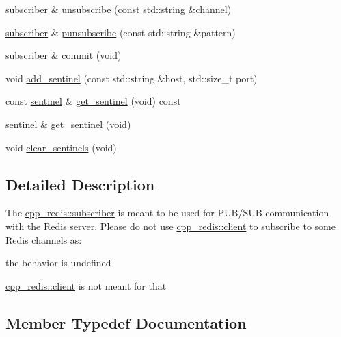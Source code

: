 \begin{DoxyCompactItemize}
\item 
\hyperlink{classcpp__redis_1_1subscriber}{subscriber} \& \hyperlink{classcpp__redis_1_1subscriber_a08dffea41cfd5914adfa5a966e0ab292}{unsubscribe} (const std\+::string \&channel)
\item 
\hyperlink{classcpp__redis_1_1subscriber}{subscriber} \& \hyperlink{classcpp__redis_1_1subscriber_a26edc7dcf87ddc8734fac04878ca307a}{punsubscribe} (const std\+::string \&pattern)
\item 
\hyperlink{classcpp__redis_1_1subscriber}{subscriber} \& \hyperlink{classcpp__redis_1_1subscriber_abbf600802ed93b82323185eec5719ecb}{commit} (void)
\item 
void \hyperlink{classcpp__redis_1_1subscriber_a10584e201abe4e701b70d078b3a676fc}{add\+\_\+sentinel} (const std\+::string \&host, std\+::size\+\_\+t port)
\item 
const \hyperlink{classcpp__redis_1_1sentinel}{sentinel} \& \hyperlink{classcpp__redis_1_1subscriber_a55a8906106adceca1faf6ab26e040f8a}{get\+\_\+sentinel} (void) const
\item 
\hyperlink{classcpp__redis_1_1sentinel}{sentinel} \& \hyperlink{classcpp__redis_1_1subscriber_ae883ef7e41753d5c1d819260d7574e4b}{get\+\_\+sentinel} (void)
\item 
void \hyperlink{classcpp__redis_1_1subscriber_ac8f371c14866842cdda7cf1ee5eee2b8}{clear\+\_\+sentinels} (void)
\end{DoxyCompactItemize}


\subsection{Detailed Description}
The \hyperlink{classcpp__redis_1_1subscriber}{cpp\+\_\+redis\+::subscriber} is meant to be used for P\+U\+B/\+S\+UB communication with the Redis server. Please do not use \hyperlink{classcpp__redis_1_1client}{cpp\+\_\+redis\+::client} to subscribe to some Redis channels as\+:
\begin{DoxyItemize}
\item the behavior is undefined
\item \hyperlink{classcpp__redis_1_1client}{cpp\+\_\+redis\+::client} is not meant for that 
\end{DoxyItemize}

\subsection{Member Typedef Documentation}
\mbox{\label{classcpp__redis_1_1subscriber_a19ea39dfabeb19937a9ce4c8d21781b4}} 
